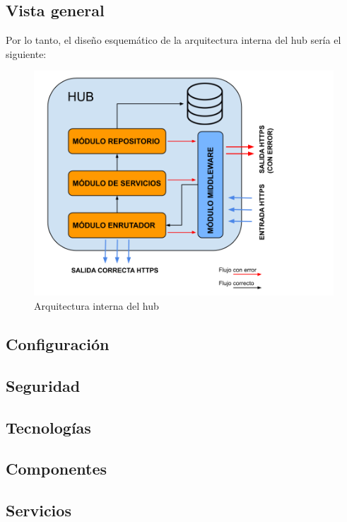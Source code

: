 \subsection{Vista general}
Por lo tanto, el diseño esquemático de la arquitectura interna del hub sería el siguiente:
\begin{figure}[H]
\centering
\includegraphics[width=6.00in]{images/arquitectura_hub.png}
\caption{Arquitectura interna del hub}
\label{fig:arquitectura_hub}
\end{figure}
\subsection{Configuración}
\subsection{Seguridad}
\subsection{Tecnologías}
\subsection{Componentes}
\subsection{Servicios}

